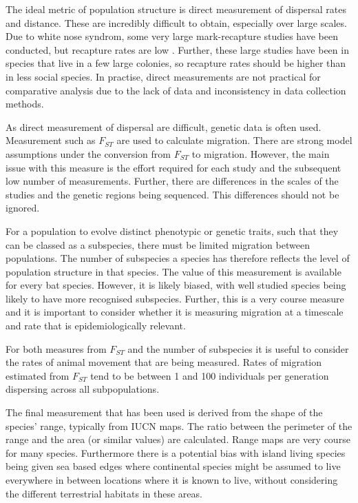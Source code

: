 The ideal metric of population structure is direct measurement of dispersal rates and distance.
These are incredibly difficult to obtain, especially over large scales.
Due to white nose syndrom, some very large mark-recapture studies have been conducted, but recapture rates are low \cite{}.
Further, these large studies have been in species that live in a few large colonies, so recapture rates should be higher than in less social species.
In practise, direct measurements are not practical for comparative analysis due to the lack of data and inconsistency in data collection methods.



As direct measurement of dispersal are difficult, genetic data is often used.
Measurement such as $F_{ST}$ are used to calculate migration.
There are strong model assumptions under the conversion from $F_{ST}$ to migration.
However, the main issue with this measure is the effort required for each study and the subsequent low number of measurements.
Further, there are differences in the scales of the studies and the genetic regions being sequenced.
This differences should not be ignored.


For a population to evolve distinct phenotypic or genetic traits, such that they can be classed as a subspecies, there must be limited migration between populations.
The number of subspecies a species has therefore reflects the level of population structure in that species.
The value of this measurement is available for every bat species.
However, it is likely biased, with well studied species being likely to have more recognised subspecies.
Further, this is a very course measure and it is important to consider whether it is measuring migration at a timescale and rate that is epidemiologically relevant.

For both measures from $F_{ST}$ and the number of subspecies it is useful to consider the rates of animal movement that are being measured.
Rates of migration estimated from $F_{ST}$ tend to be between 1 and 100 individuals per generation dispersing across all subpopulations.



The final measurement that has been used is derived from the shape of the species' range, typically from IUCN \cite{iucn} maps.
The ratio between the perimeter of the range and the area (or similar values) are calculated.
Range maps are very course for many species.
Furthermore there is a potential bias with island living species being given sea based edges where continental species might be assumed to live everywhere in between locations where it is known to live, without considering the different terrestrial habitats in these areas.

